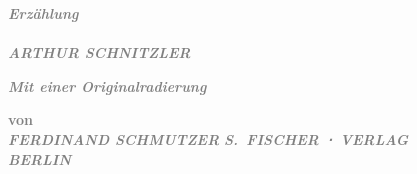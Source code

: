 \pstart
           \centering{}\textcolor{gray}{\textbf{\emph{Erzählung}}}{\\}\textcolor{gray}{\textbf{}}{\\}\textcolor{gray}{\textbf{\emph{ARTHUR SCHNITZLER}}}\pend
           
\pstart
           \centering{}\textcolor{gray}{\textbf{\emph{Mit einer Originalradierung}}}\pend
           
\pstart
           \centering{}\textcolor{gray}{\textbf{von}}{\\}\textcolor{gray}{\textbf{\emph{FERDINAND SCHMUTZER}}}\pend
           {\vspace{1\baselineskip}}
\pstart
           \centering{}\textcolor{gray}{\textbf{\emph{S. FISCHER ⋅ VERLAG}}}{\\}\textcolor{gray}{\textbf{\emph{BERLIN\label{K_L03614-1v}\label{K_L03614-1}}}}\pend
           \endnumbering{}  \newcommand{\dateiname}{L03614}\newcommand{\titel}{Arthur Schnitzler und Ferdinand Schmutzer: Widmungsexemplar Der blinde Geronimo und sein Bruder für Felix Salten, [29. 5. 1915?]}\newcommand{\editorInnen}{Martin Anton Müller und Laura Untner}
